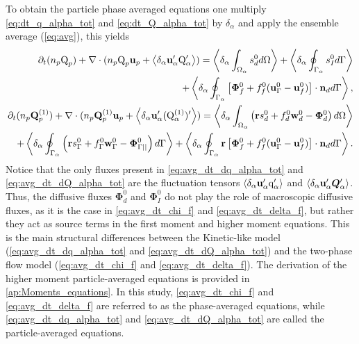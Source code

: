 To obtain the particle phase averaged equations one multiply \ref{eq:dt_q_alpha_tot} and \ref{eq:dt_Q_alpha_tot} by $\delta_\alpha$ and apply the ensemble average (\ref{eq:avg}), this yields
\begin{align}
    \partial_t (n_p\text Q_p)
    + \mathbf{\nabla}\cdot (n_p \text Q_p \textbf{u}_p + \left<\delta_\alpha \textbf{u}_\alpha' \text Q_\alpha'\right>)
    = \left<\delta_\alpha \int_{\Omega_{\alpha}}  s_d^0  d\Omega\right>
    + \left<\delta_\alpha \oint_{\Gamma_{\alpha}}  s_I^0  d\Gamma\right>\nonumber\\
    + \left<\delta_\alpha \oint_{\Gamma_{\alpha}}  \left[\mathbf{\Phi}_f^0 + f_f^0 (\textbf{u}_\Gamma^0-\textbf{u}_f^0) \right] \cdot \textbf{n}_d  d\Gamma\right>,
    \label{eq:avg_dt_dq_alpha_tot}\\
    \partial_t (n_p\textbf{Q}_p^{(1)})
    + \mathbf{\nabla}\cdot (n_p \textbf{Q}_p^{(1)} \textbf{u}_p + \left<\delta_\alpha \textbf{u}_\alpha' (\text Q_\alpha^{(1)})'\right>)
    =\left<\delta_\alpha \int_{\Omega_{\alpha}}  \left(
        \textbf{r} s_d^0         
        + f_d^0  \textbf{w}_d^0 
        - \mathbf{\Phi}_d^0
    \right)  d\Omega\right>\nonumber\\
    + \left<\delta_\alpha \oint_{\Gamma_{\alpha}}  \left(
        \textbf{r}s_\Gamma^0
        + f_\Gamma^0 \textbf{w}_\Gamma^0
        - \mathbf{\Phi}_{\Gamma||}^0
    \right)  d\Gamma\right>
    + \left<\delta_\alpha \oint_{\Gamma_{\alpha}}  \textbf{r} \left[
        \mathbf{\Phi}_f^0
        + f_f^0 (\textbf{u}_\Gamma^0-\textbf{u}_f^0)
    \right]\cdot \textbf{n}_d   d\Gamma\right>.
    \label{eq:avg_dt_dQ_alpha_tot}
\end{align}
Notice that the only fluxes present in \ref{eq:avg_dt_dq_alpha_tot} and \ref{eq:avg_dt_dQ_alpha_tot} are the fluctuation tensors $\left<\delta_\alpha \textbf{u}_\alpha' \text q_\alpha'\right>$ and $\left<\delta_\alpha \textbf{u}_\alpha' \bm{Q}_\alpha'\right>$. 
Thus, the diffusive fluxes $\bm\Phi_d^0$ and $\bm\Phi_I^0$ do not play the role of macroscopic diffusive fluxes, as it is the case in \ref{eq:avg_dt_chi_f} and \ref{eq:avg_dt_delta_f}, but rather they act as source terms in the first moment and higher moment equations. 
This is the main structural differences between the Kinetic-like model (\ref{eq:avg_dt_dq_alpha_tot} and \ref{eq:avg_dt_dQ_alpha_tot}) and the two-phase flow model (\ref{eq:avg_dt_chi_f} and \ref{eq:avg_dt_delta_f}). 
The derivation of the higher moment particle-averaged equations is provided in \ref{ap:Moments_equations}.
In this study, \ref{eq:avg_dt_chi_f} and \ref{eq:avg_dt_delta_f} are referred to as the phase-averaged equations, while \ref{eq:avg_dt_dq_alpha_tot} and \ref{eq:avg_dt_dQ_alpha_tot} are called the particle-averaged equations. 

 



